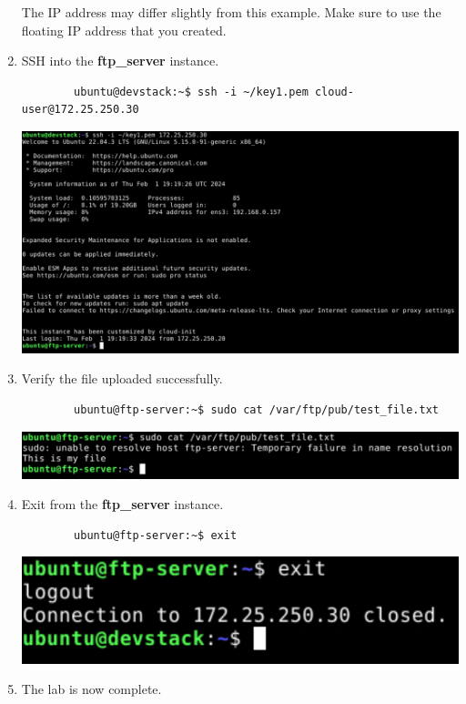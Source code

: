 \documentclass[letterpaper, 12pt]{article}
\begin{document}
\begin{enumerate}
    \begin{notebox}
        The IP address may differ slightly from this example. Make sure to use the floating IP address that you created.
    \end{notebox}

    \item SSH into the \textbf{ftp\_server} instance.
    \begin{lstlisting}
        ubuntu@devstack:~$ ssh -i ~/key1.pem cloud-user@172.25.250.30
    \end{lstlisting}

    \begin{center}
        \includegraphics[width=\linewidth]{images/part1/step52.png}
    \end{center}

    \item Verify the file uploaded successfully.
    \begin{lstlisting}
        ubuntu@ftp-server:~$ sudo cat /var/ftp/pub/test_file.txt
    \end{lstlisting}

    \begin{center}
        \includegraphics[width=\linewidth]{images/part1/step53.png}
    \end{center}

    \item Exit from the \textbf{ftp\_server} instance.
    \begin{lstlisting}
        ubuntu@ftp-server:~$ exit
    \end{lstlisting}

    \begin{center}
        \includegraphics[width=\linewidth]{images/part1/step54.png}
    \end{center}

    \item The lab is now complete.

\end{enumerate}
\end{document}

